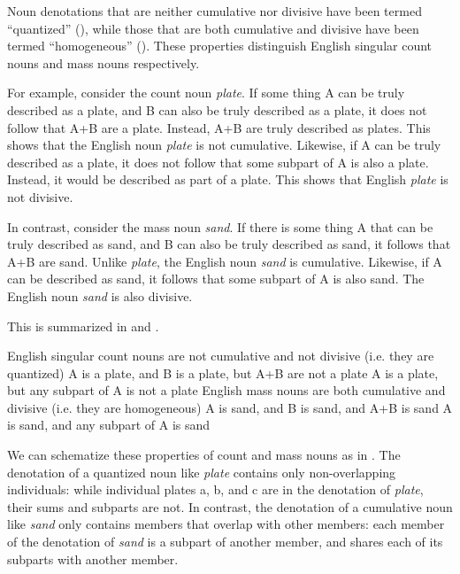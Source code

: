 \documentclass[output=paper,colorlinks,citecolor=brown]{langscibook}
\begin{document}
Noun denotations that are neither cumulative nor divisive have been termed ``quantized'' (\citealt{Krifka1989, Deal2017}), while those that are both cumulative and divisive have been termed ``homogeneous'' (\citealt{Bunt1985, Deal2017}). These properties distinguish English singular count nouns and mass nouns respectively.

For example, consider the count noun  \textit{plate}. If some thing A can be truly described as a plate, and B can also be truly described as a plate, it does not follow that A+B are a plate. Instead, A+B are truly described as plates. This shows that the English noun  \textit{plate} is not cumulative. Likewise, if A can be truly described as a plate, it does not follow that some subpart of A is also a plate. Instead, it would be described as part of a plate. This shows that English  \textit{plate} is not divisive.

In contrast, consider the mass noun \textit{sand}. If there is some thing A that can be truly described as sand, and B can also be truly described as sand, it follows that A+B are sand. Unlike \textit{plate}, the English noun \textit{sand} is cumulative. Likewise, if A can be described as sand, it follows that some subpart of A is also sand. The English noun \textit{sand} is also divisive.

This is summarized in  and .

\ea%
    \label{ex:sande:15}
    English singular count nouns are not cumulative and not divisive (i.e. they are quantized)
    \ea%
    \label{ex:sande:15a}
    A is a plate, and B is a plate, but A+B are not a plate
    \ex%
    \label{ex:sande:15b}
    A is a plate, but any subpart of A is not a plate
    \z
\ex%
    \label{ex:sande:16}
    English mass nouns are both cumulative and divisive (i.e. they are homogeneous)
    \ea%
    \label{ex:sande:16a}
    A is sand, and B is sand, and A+B is sand
    \ex%
    \label{ex:sande:16b}
    A is sand, and any subpart of A is sand
    \z
\z

We can schematize these properties of count and mass nouns as in . The denotation of a quantized noun like  \textit{plate} contains only non-overlapping individuals: while individual plates a, b, and c are in the denotation of \textit{plate}, their sums and subparts are not. In contrast, the denotation of a cumulative noun like \textit{sand} only contains members that overlap with other members: each member of the denotation of \textit{sand} is a subpart of another member, and shares each of its subparts with another member.
\end{document}
